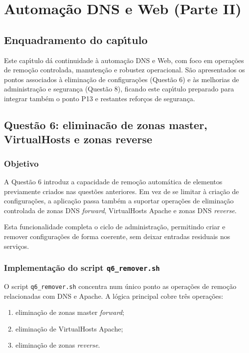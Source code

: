 ﻿\chapter{Automa\c{c}\~ao DNS e Web (Parte II)}
\label{cap4}

\section{Enquadramento do cap\'{\i}tulo}

Este cap\'{\i}tulo d\'{a} continuidade \`a automa\c{c}\~ao DNS e Web, com foco em opera\c{c}\~oes de remo\c{c}\~ao controlada, manuten\c{c}\~ao e robustez operacional. S\~ao apresentados os pontos associados \`a elimina\c{c}\~ao de configura\c{c}\~oes (Quest\~ao 6) e \`as melhorias de administra\c{c}\~ao e seguran\c{c}a (Quest\~ao 8), ficando este cap\'{\i}tulo preparado para integrar tamb\'{e}m o ponto P13 e restantes refor\c{c}os de seguran\c{c}a.
\section{Quest\~ao 6: eliminac\~ao de zonas master, VirtualHosts e zonas reverse}
\label{sec:q6}

\subsection{Objetivo}

A Quest\~ao 6 introduz a capacidade de remo\c{c}\~ao autom\'atica de elementos previamente criados nas quest\~oes anteriores. Em vez de se limitar \`a cria\c{c}\~ao de configura\c{c}\~oes, a aplica\c{c}\~ao passa tamb\'em a suportar opera\c{c}\~oes de elimina\c{c}\~ao controlada de zonas DNS \textit{forward}, VirtualHosts Apache e zonas DNS \textit{reverse}.

Esta funcionalidade completa o ciclo de administra\c{c}\~ao, permitindo criar e remover configura\c{c}\~oes de forma coerente, sem deixar entradas residuais nos servi\c{c}os.

\subsection{Implementa\c{c}\~ao do script \texttt{q6\_remover.sh}}

O script \texttt{q6\_remover.sh} concentra num \'unico ponto as opera\c{c}\~oes de remo\c{c}\~ao relacionadas com DNS e Apache. A l\'ogica principal cobre tr\^es opera\c{c}\~oes:

\begin{enumerate}
    \item elimina\c{c}\~ao de zonas master \textit{forward};
    \item elimina\c{c}\~ao de VirtualHosts Apache;
    \item elimina\c{c}\~ao de zonas \textit{reverse}.
\end{enumerate}

